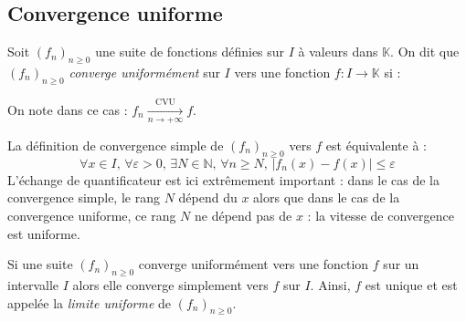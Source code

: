 \documentclass[french,11pt,twoside]{VcCours}
\begin{document}
\subsection{Convergence uniforme}

\begin{Definition}{} Soit $(f_n)_{n \geq 0}$ une suite de fonctions définies sur $I$ à valeurs dans $\mathbb{K}$. On dit que $(f_n)_{n \geq 0}$ \emph{converge uniformément} sur $I$ vers une fonction $f : I \rightarrow \mathbb{K}$ si : 
$$\phantom{\forall \varepsilon >0, \, \exists N \in \mathbb{N}, \, \forall n \geq N, \, \forall x \in I, \, \vert f_n(x)-f(x) \vert \leq \varepsilon}$$
On note dans ce cas : $f_n \xrightarrow[n \rightarrow + \infty]{\textrm{CVU}} f$.
\end{Definition}

%


\begin{Remarque}{} 
La définition de convergence simple de $(f_n)_{n \geq 0}$ vers $f$ est équivalente à :
$$ \forall x \in I, \,  \forall \varepsilon >0, \, \exists N \in \mathbb{N}, \, \forall n \geq N,  \, \vert f_n(x)-f(x) \vert \leq \varepsilon$$
L'échange de quantificateur est ici extrêmement important : dans le cas de la convergence simple, le rang $N$ dépend du $x$ alors que dans le cas de la convergence uniforme, ce rang $N$ ne dépend pas de $x$ : la \og vitesse \fg{} de convergence est uniforme.
\end{Remarque}

\begin{Proposition}{}  Si une suite $(f_n)_{n \geq 0}$ converge uniformément vers une fonction $f$ sur un intervalle $I$ alors elle converge simplement vers $f$ sur $I$. Ainsi, $f$ est unique et est appelée la \emph{limite uniforme} de $(f_n)_{n \geq 0}$.
\end{Proposition}
\begin{Demonstration}{}

\vspace*{8cm}
\end{Demonstration}
\end{document}
